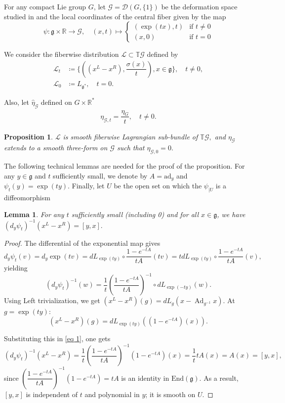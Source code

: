 \documentclass[reqno]{amsart}
\theoremstyle{plain}
\newtheorem{Prop}[Thm]{Proposition}
\newtheorem{Lem}[Thm]{Lemma}
\theoremstyle{definition}
\newcommand{\R}{\mathbb{R}}
\newcommand{\G}{\mathcal{G}}
\newcommand{\g}{\mathfrak{g}}
\newcommand{\too}{\longrightarrow}
\newcommand{\mtoo}{\longmapsto}
\newcommand{\Ad}{\operatorname{Ad}}
\renewcommand{\L}{\mathcal{L}}
\newcommand{\D}{\mathcal{D}}
\begin{document}
For any compact Lie group $G$, let $ \G = \D(G,\{1\})$ be the deformation space studied in \cite{burelle2026deformations} and the local coordinates of the central fiber \cite[]{burelle2026deformations} given by the map \[
\psi : \g \times \R \too \G, \quad
(x, t) \mtoo
\begin{cases}
(\exp(tx), t) & \text{if } t \ne 0 \\
(x, 0) & \text{if } t = 0
\end{cases}
\]   


We consider the fiberwise distribution $\L  \subset \mathbb{T}\G$ defined by \begin{align*}
    \L_{t} &\coloneqq \{((x^{L} - x^{R}), \dfrac{\sigma(x)}{t}), x\in \g\}, \quad t \neq 0,\\
    \L_{0} &\coloneqq L_{\g^{*}}, \quad t = 0.
\end{align*}  

Also, let $\widehat{\eta}_\G$ defined on $G\times \R^{*}$ \begin{align*}
    \eta_{\G,t} = \dfrac{\eta_G}{t}, \quad t\neq 0.
\end{align*}




\begin{Prop} \label{Dirac G}
$\L$ is smooth fiberwise Lagrangian sub-bundle of $\mathbb{T}\G,$ and $\eta_{\G}$ extends to a smooth three-form on $\G$ such that $\eta_{\G,0} = 0.$
\end{Prop}

The following technical lemmas are needed for the proof of the proposition. For any $y\in \g$ and $t$ sufficiently small, we denote by $A = \mathrm{ad}_y$ and $\psi_{t}(y) = \exp(ty).$ Finally, let $U$ be the open set on which the $\psi_{|U}$ is a diffeomorphism

\begin{Lem} \label{vect}
For any $t$ sufficiently small (including 0) and for all $x\in \g$, we have $(d_{y}\psi_{t})^{-1}(x^{L}-x^R) = [y,x].$  
\end{Lem}

\begin{proof}
The differential of the exponential map gives \[ d_{y}\psi_{t}(v) = d_{y}\exp(tv) = dL_{\exp(ty)} \circ \dfrac{1- e^{-tA}}{tA}(tv) = tdL_{\exp(ty)}\circ \dfrac{1 - e^{-tA}}{tA}(v),\] yielding \begin{equation} \label{eq 1}
    (d_{y}\psi_{t})^{-1}(w) = \dfrac{1}{t} (\dfrac{1 - e^{-tA}}{tA})^{-1} \circ dL_{\exp(-ty)}(w).
\end{equation}
Using Left trivialization, we get $(x^{L} - x^{R})(g) = dL_{g}(x - \Ad_{g^{-1}}x).$ At $g = \exp(ty):$ \[
(x^{L} - x^{R})(g) = dL_{\exp(ty)}((1 - e^{-tA})(x)). 
\]

Substituting this in \ref{eq 1}, one gets \[
(d_{y}\psi_{t})^{-1}(x^L - x^R) = \dfrac{1}{t} (\dfrac{1 - e^{-tA}}{tA})^{-1} (1 - e^{-tA})(x) = \dfrac{1}{t}tA(x) = A(x) = [y,x],
\]
since $(\dfrac{1 - e^{-tA}}{tA})^{-1}(1 - e^{-tA}) = tA$ is an identity in $\text{End}(\g).$ As a result, $[y,x]$ is independent of $t$ and polynomial in $y$; it is smooth on $U.$
\end{proof}
\end{document}
